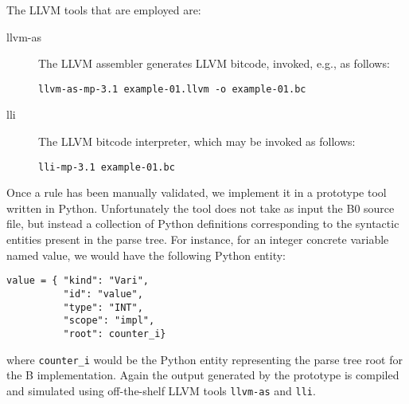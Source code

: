 \documentclass{llncs}
\newcommand{\B}[1]{\textsf{#1}}
\begin{document}
The LLVM tools that are employed are:
\begin{description}
\item[llvm-as] The LLVM assembler generates LLVM bitcode, invoked, e.g., as
  follows:
\begin{verbatim}
llvm-as-mp-3.1 example-01.llvm -o example-01.bc
\end{verbatim}
\item[lli] The LLVM bitcode interpreter, which may be invoked as follows:
\begin{verbatim}
lli-mp-3.1 example-01.bc
\end{verbatim}
\end{description}

Once a rule has been manually validated, we implement it in a prototype tool
written in Python. Unfortunately the tool does not take as input the B0 source
file, but instead a collection of Python definitions corresponding to the
syntactic entities present in the parse tree. For instance, for an integer
concrete variable named \B{value}, we would have the following Python entity:
\begin{verbatim}
value = { "kind": "Vari",
          "id": "value",
          "type": "INT",
          "scope": "impl",
          "root": counter_i}
\end{verbatim}
where \verb'counter_i' would be the Python entity representing the parse tree
root for the B implementation. Again the output generated by the prototype
is compiled and simulated using off-the-shelf LLVM tools \verb'llvm-as' and
\verb'lli'.
\end{document}
